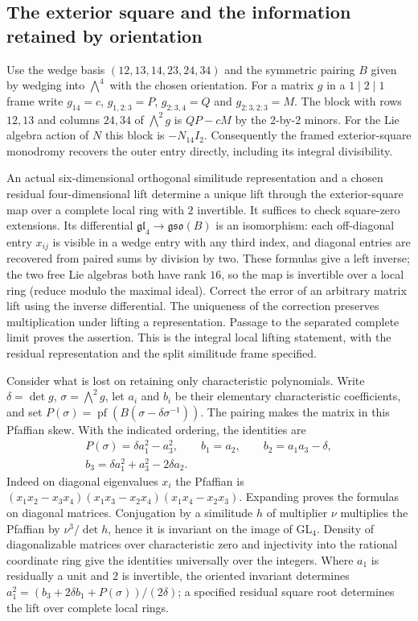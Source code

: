 \documentclass[11pt]{article}
\begin{document}
\subsection{The exterior square and the information retained by orientation}
Use the wedge basis $(12,13,14,23,24,34)$ and the symmetric pairing $B$
given by wedging into $\bigwedge^4$ with the chosen orientation. For
a matrix $g$ in a $1\mid2\mid1$ frame write $g_{14}=c$, $g_{1,2:3}=P$,
$g_{2:3,4}=Q$ and $g_{2:3,2:3}=M$. The block with rows $12,13$ and
columns $24,34$ of $\bigwedge^2g$ is $QP-cM$ by the $2$-by-$2$ minors.
For the Lie algebra action of $N$ this block is $-N_{14}I_2$. Consequently
the framed exterior-square monodromy recovers the outer entry directly,
including its integral divisibility.

An actual six-dimensional orthogonal similitude representation and a
chosen residual four-dimensional lift determine a unique lift through
the exterior-square map over a complete local ring with $2$ invertible.
It suffices to check square-zero extensions. Its differential
$\mathfrak{gl}_4\to\mathfrak{gso}(B)$ is an isomorphism: each
off-diagonal entry $x_{ij}$ is visible in a wedge entry with any third
index, and diagonal entries are recovered from paired sums by division
by two. These formulas give a left inverse; the two free Lie algebras
both have rank $16$, so the map is invertible over a local ring (reduce
modulo the maximal ideal). Correct the error of an arbitrary matrix
lift using the inverse differential. The uniqueness of the correction
preserves multiplication under lifting a representation. Passage to
the separated complete limit proves the assertion. This is the
integral local lifting statement, with the residual representation
and the split similitude frame specified.

Consider what is lost on retaining only characteristic polynomials.
Write $\delta=\det g$, $\sigma=\bigwedge^2g$, let $a_i$ and $b_i$ be
their elementary characteristic coefficients, and set
$P(\sigma)=\operatorname{pf}(B(\sigma-\delta\sigma^{-1}))$.
The pairing makes the matrix in this Pfaffian skew. With the indicated
ordering, the identities are
\[
 \begin{gathered}
 P(\sigma)=\delta a_1^2-a_3^2,\qquad b_1=a_2,\qquad
 b_2=a_1a_3-\delta,\\
 b_3=\delta a_1^2+a_3^2-2\delta a_2 .
 \end{gathered}
\]
Indeed on diagonal eigenvalues $x_i$ the Pfaffian is
$(x_1x_2-x_3x_4)(x_1x_3-x_2x_4)(x_1x_4-x_2x_3)$.
Expanding proves the formulas on diagonal matrices. Conjugation by a
similitude $h$ of multiplier $\nu$ multiplies the Pfaffian by
$\nu^3/\det h$, hence it is invariant on the image of $\mathrm{GL}_4$.
Density of diagonalizable matrices over characteristic zero and
injectivity into the rational coordinate ring give the identities
universally over the integers. Where $a_1$ is residually a unit and
$2$ is invertible, the oriented invariant determines
$a_1^2=(b_3+2\delta b_1+P(\sigma))/(2\delta)$; a specified residual
square root determines the lift over complete local rings.
\end{document}

